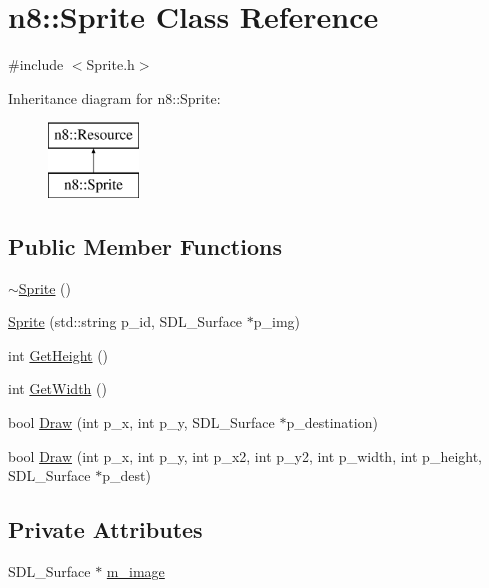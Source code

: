 \hypertarget{classn8_1_1_sprite}{\section{n8\-:\-:Sprite Class Reference}
\label{classn8_1_1_sprite}
}


{\ttfamily \#include $<$Sprite.\-h$>$}

Inheritance diagram for n8\-:\-:Sprite\-:\begin{figure}[H]
\begin{center}
\leavevmode
\includegraphics[height=2.000000cm]{classn8_1_1_sprite}
\end{center}
\end{figure}
\subsection*{Public Member Functions}
\begin{DoxyCompactItemize}
\item 
\hyperlink{classn8_1_1_sprite_a6cbe9ac58c5f03c898b8247b96852769}{$\sim$\-Sprite} ()
\item 
\hyperlink{classn8_1_1_sprite_a8c20ff646bf175ed1419bf85dac7368f}{Sprite} (std\-::string p\-\_\-id, S\-D\-L\-\_\-\-Surface $\ast$p\-\_\-img)
\item 
int \hyperlink{classn8_1_1_sprite_a7de2553c07f843b8fd6a1431342e463f}{Get\-Height} ()
\item 
int \hyperlink{classn8_1_1_sprite_a683b19b12bc8d3b655598666200b1387}{Get\-Width} ()
\item 
bool \hyperlink{classn8_1_1_sprite_a54005df4d27a045f844b0074b5e1b119}{Draw} (int p\-\_\-x, int p\-\_\-y, S\-D\-L\-\_\-\-Surface $\ast$p\-\_\-destination)
\item 
bool \hyperlink{classn8_1_1_sprite_a074384ce9bc2c0a5c7740c1d8faeb501}{Draw} (int p\-\_\-x, int p\-\_\-y, int p\-\_\-x2, int p\-\_\-y2, int p\-\_\-width, int p\-\_\-height, S\-D\-L\-\_\-\-Surface $\ast$p\-\_\-dest)
\end{DoxyCompactItemize}
\subsection*{Private Attributes}
\begin{DoxyCompactItemize}
\item 
S\-D\-L\-\_\-\-Surface $\ast$ \hyperlink{classn8_1_1_sprite_a8bbf98f385191ab5d756784ceac802b1}{m\-\_\-image}
\end{DoxyCompactItemize}

